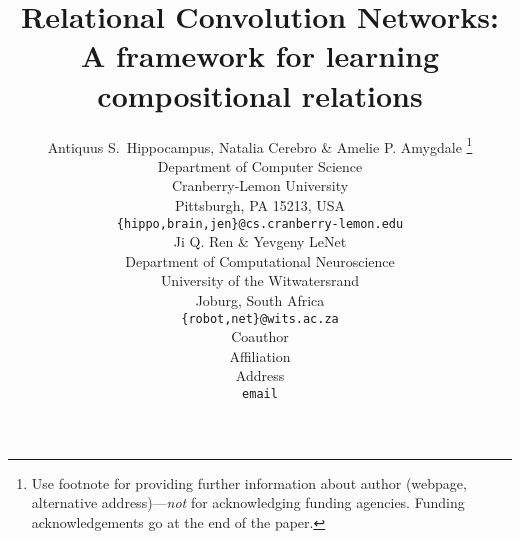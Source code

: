 \documentclass{article}
\title{Relational Convolution Networks: A framework for learning compositional relations}
\author{Antiquus S.~Hippocampus, Natalia Cerebro \& Amelie P. Amygdale \thanks{ Use footnote for providing further information
about author (webpage, alternative address)---\emph{not} for acknowledging
funding agencies.  Funding acknowledgements go at the end of the paper.} \\
Department of Computer Science\\
Cranberry-Lemon University\\
Pittsburgh, PA 15213, USA \\
\texttt{\{hippo,brain,jen\}@cs.cranberry-lemon.edu} \\
\And
Ji Q. Ren \& Yevgeny LeNet \\
Department of Computational Neuroscience \\
University of the Witwatersrand \\
Joburg, South Africa \\
\texttt{\{robot,net\}@wits.ac.za} \\
\AND
Coauthor \\
Affiliation \\
Address \\
\texttt{email}
}
\begin{document}
\maketitle













% 



\medskip

\clearpage
{%



}

\clearpage
\appendix

\end{document}
